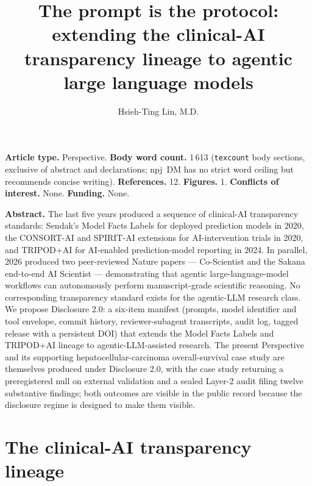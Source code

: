 \documentclass[11pt,a4paper]{article}
\title{\fontsize{15}{18}\bfseries\sffamily
The prompt is the protocol: extending the clinical-AI transparency lineage to agentic large language models}
\author[1,*]{Hsieh-Ting Lin, M.D.}
\affil[1]{Department of Hematology and Medical Oncology, Koo Foundation Sun Yat-Sen Cancer Center, Taipei, Taiwan. ORCID: 0009-0002-3974-4528.}
\affil[*]{Correspondence: \texttt{mail@hsiehting.com}.}
\date{}
\begin{document}
\maketitle\thispagestyle{empty}\vspace{-2em}

\noindent\textbf{Article type.} Perspective. \textbf{Body word count.} 1\,613 (\texttt{texcount} body sections, exclusive of abstract and declarations; npj~DM has no strict word ceiling but recommends concise writing). \textbf{References.} 12. \textbf{Figures.} 1. \textbf{Conflicts of interest.} None. \textbf{Funding.} None.

\medskip

\noindent\textbf{Abstract.} The last five years produced a sequence of clinical-AI transparency standards: Sendak's Model Facts Labels\citep{sendak2020} for deployed prediction models in 2020, the CONSORT-AI and SPIRIT-AI extensions\citep{consortAI2020} for AI-intervention trials in 2020, and TRIPOD+AI\citep{tripodAI2024} for AI-enabled prediction-model reporting in 2024. In parallel, 2026 produced two peer-reviewed Nature papers --- Co-Scientist\citep{coscientist2026} and the Sakana end-to-end AI Scientist\citep{luSakana2026} --- demonstrating that agentic large-language-model workflows can autonomously perform manuscript-grade scientific reasoning. No corresponding transparency standard exists for the agentic-LLM research class. We propose Disclosure 2.0: a six-item manifest (prompts, model identifier and tool envelope, commit history, reviewer-subagent transcripts, audit log, tagged release with a persistent DOI) that extends the Model Facts Labels and TRIPOD+AI lineage to agentic-LLM-assisted research. The present Perspective and its supporting hepatocellular-carcinoma overall-survival case study are themselves produced under Disclosure 2.0, with the case study returning a preregistered null on external validation and a sealed Layer-2 audit filing twelve substantive findings; both outcomes are visible in the public record because the disclosure regime is designed to make them visible.

\section{The clinical-AI transparency lineage}
\end{document}
